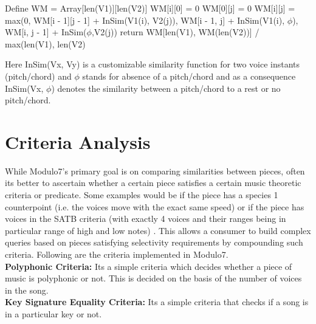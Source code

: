 \begin{algorithm}

\label{SMAlgorithm}
\begin{algorithmic}[1]
 {}
\State Define WM = Array[len(V1)][len(V2)]
\State WM[i][0] = 0
\EndFor
{}
\State WM[0][j] = 0
\EndFor
{}
\State WM[i][j] = max(0, WM[i - 1][j - 1] + InSim(V1(i), V2(j)), WM[i - 1, j] + InSim(V1(i), $\phi$), WM[i, j - 1] + InSim($\phi$,V2(j))
\EndFor
\EndFor
\State return WM[len(V1), WM(len(V2))] / max(len(V1), len(V2)
\EndProcedure
\end{algorithmic}
\end{algorithm}

\noindent Here InSim(Vx, Vy) is a customizable similarity function for two voice instants (pitch/chord) and $\phi$ stands for absence of a pitch/chord and as a consequence  InSim(Vx, $\phi$) denotes the similarity between a pitch/chord to a rest or no pitch/chord.  

\section{Criteria Analysis} \label{criteria}

\noindent While Modulo7's primary goal is on comparing similarities between pieces, often its better to ascertain whether a certain piece satisfies a certain music theoretic criteria or predicate. Some examples would be if the piece has a species 1 counterpoint (i.e. the voices move with the exact same speed\cite{theorytreatise}) or if the piece has voices in the SATB criteria (with exactly 4 voices and their ranges being in particular range of high and low notes) \cite{satbcriteria}. This allows a consumer to build complex queries based on pieces satisfying selectivity requirements by compounding such criteria. Following are the criteria implemented in Modulo7. \\

\noindent \textbf{Polyphonic Criteria:} Its a simple criteria which decides whether a piece of music is polyphonic or not. This is decided on the basis of the number of voices in the song. \\

\noindent \textbf{Key Signature Equality Criteria:} Its a simple criteria that checks if a song is in a particular key or not. \\

